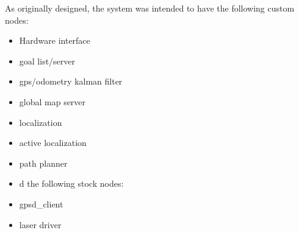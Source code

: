 As originally designed, the system was intended to have the following custom nodes:
\begin{itemize}
   \item Hardware interface
   \item goal list/server
   \item gps/odometry kalman filter
   \item global map server
   \item localization
   \item active localization
   \item path planner
   \item d the following stock nodes:
   \item gpsd\_client
   \item laser driver
\end{itemize}
